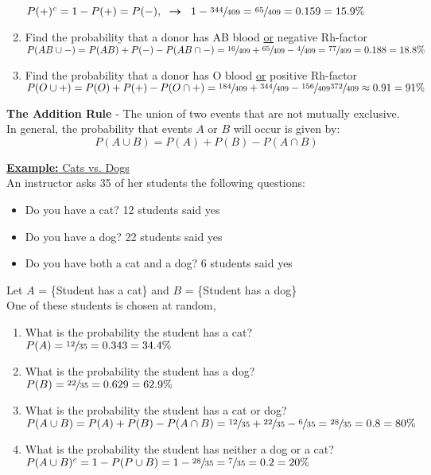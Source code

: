 \documentclass[a4paper]{article}
\let\bf\textbf
\begin{document}
\begin{shaded}
\begin{enumerate}
        $P(+)^c = 1 - P(+) = P(-), \hspace{2mm}\boldsymbol{\to}\hspace{2mm} 1 - \sfrac{344}{409} = \sfrac{65}{409} = 0.159 = 15.9\%$
        \item Find the probability that a donor has AB blood \underline{or} negative Rh-factor\\
        $P(AB \cup -) = P(AB) + P(-) - P(AB \cap -) = \sfrac{16}{409} + \sfrac{65}{409} - \sfrac{4}{409} = \sfrac{77}{409} = 0.188 = 18.8\%$
        \item Find the probability that a donor has O blood \underline{or} positive Rh-factor\\
        $P(O \cup +) = P(O) + P(+) - P(O \cap +) = \sfrac{184}{409} + \sfrac{344}{409} - \sfrac{156}{409} \sfrac{372}{409} \approx 0.91 = 91\%$
    \end{enumerate}
\end{shaded}

\noindent\bf{The Addition Rule} - The union of two events that are not mutually exclusive. In general, the probability that events $A$ or $B$ will occur is given by:
\begin{equation}
    P(A \cup B) = P(A) + P(B) - P(A \cap B)
\end{equation}
\begin{shaded}
    \underline{\bf{Example:} Cats vs. Dogs}
    \vspace{2mm}\\
    An instructor asks 35 of her students the following questions:
    \begin{itemize}
        \item Do you have a cat? 12 students said yes
        \item Do you have a dog? 22 students said yes
        \item Do you have both a cat and a dog? 6 students said yes
    \end{itemize}
    \vspace{1mm}
    Let $A$ = \{Student has a cat\} and $B$ = \{Student has a dog\}\\
    One of these students is chosen at random,
    \begin{enumerate}
        \item What is the probability the student has a cat?\\
        $P(A) = \sfrac{12}{35} = 0.343 = 34.4\%$
        \item What is the probability the student has a dog?\\
        $P(B) = \sfrac{22}{35} = 0.629 = 62.9\%$
        \item What is the probability the student has a cat or dog?\\
        $P(A \cup B) = P(A) + P(B) - P(A \cap B) = \sfrac{12}{35} + \sfrac{22}{35} - \sfrac{6}{35} = \sfrac{28}{35} = 0.8 = 80\%$
        \item What is the probability the student has neither a dog or a cat?\\
        $P(A \cup B)^c = 1 - P(P \cup B) = 1 - \sfrac{28}{35} = \sfrac{7}{35} = 0.2 = 20\%$
    \end{enumerate}
\end{shaded}
\end{document}
